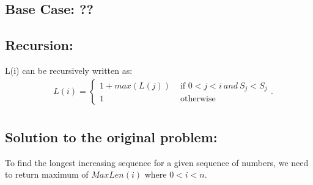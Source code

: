 \documentclass[a4paper]{scrartcl}
\begin{document}
  \subsection{Base Case: ??}
  \subsection{Recursion:}
  L(i) can be recursively written as:
  \begin{align*}
   &\ L(i) = 
   \begin{cases} 
    1 + max(L(j))  &\mbox{ if } 0 < j < i\ and\ S_j < S_j
    \\
    1 &\mbox{ otherwise}
  \end{cases}. \\
  \end{align*}
  \subsection{Solution to the original problem:}
  To find the longest increasing sequence for a given sequence of numbers, we need to return maximum of $MaxLen(i)$ where $0 < i < n$.
 
\end{document}
